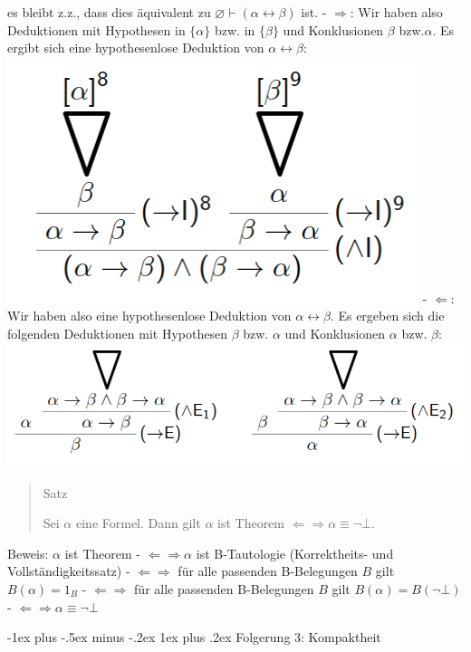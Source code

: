 \documentclass[a4paper]{article}
\makeatletter
\renewcommand{\subsubsection}{\@startsection{subsubsection}{3}{0mm}%
                {-1ex plus -.5ex minus -.2ex}%
                {1ex plus .2ex}%
                {\normalfont\small\bfseries}}
\makeatother
\begin{document}
\begin{multicols}{3}
  es bleibt z.z., dass dies äquivalent zu
  $\varnothing\vdash(\alpha\leftrightarrow\beta)$ ist. - $\Rightarrow$:
  Wir haben also Deduktionen mit Hypothesen in $\{\alpha\}$ bzw. in
  $\{\beta\}$ und Konklusionen $\beta$ bzw.$\alpha$. Es ergibt sich eine
  hypothesenlose Deduktion von $\alpha\leftrightarrow\beta$:
  \includegraphics[width=\linewidth]{Assets/Logik-deduktion-1.png} - $\Leftarrow$: Wir haben
  also eine hypothesenlose Deduktion von $\alpha\leftrightarrow\beta$. Es
  ergeben sich die folgenden Deduktionen mit Hypothesen $\beta$ bzw.
  $\alpha$ und Konklusionen $\alpha$ bzw. $\beta$:
  \includegraphics[width=\linewidth]{Assets/Logik-deduktion-2.png}

  \begin{quote}
    Satz

    Sei $\alpha$ eine Formel. Dann gilt $\alpha$ ist Theorem
    $\Leftarrow\Rightarrow\alpha\equiv\lnot\bot$.
  \end{quote}

  Beweis: $\alpha$ ist Theorem - $\Leftarrow\Rightarrow\alpha$ ist
  B-Tautologie (Korrektheits- und Vollständigkeitssatz) -
  $\Leftarrow\Rightarrow$ für alle passenden B-Belegungen $B$ gilt
  $B(\alpha) = 1_B$ - $\Leftarrow\Rightarrow$ für alle passenden
  B-Belegungen $B$ gilt $B(\alpha) =B(\lnot\bot)$ -
  $\Leftarrow\Rightarrow\alpha\equiv\lnot\bot$

  \subsubsection{Folgerung 3: Kompaktheit}\label{folgerung-3-kompaktheit}


\end{multicols}
\end{document}

